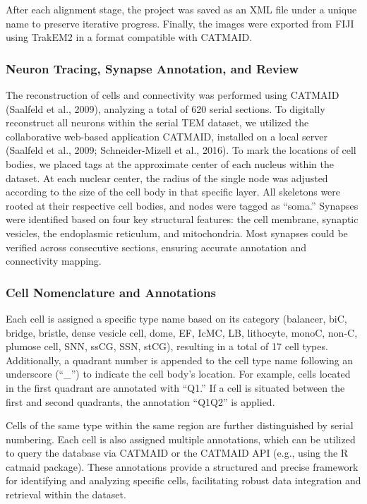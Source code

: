 \documentclass[
  11pt,
]{article}
\begin{document}
After each alignment stage, the project was saved as an XML file under a
unique name to preserve iterative progress. Finally, the images were
exported from FIJI using TrakEM2 in a format compatible with CATMAID.

\subsubsection{Neuron Tracing, Synapse Annotation, and
Review}\label{neuron-tracing-synapse-annotation-and-review}

The reconstruction of cells and connectivity was performed using CATMAID
(Saalfeld et al., 2009), analyzing a total of 620 serial sections. To
digitally reconstruct all neurons within the serial TEM dataset, we
utilized the collaborative web-based application CATMAID, installed on a
local server (Saalfeld et al., 2009; Schneider-Mizell et al., 2016). To
mark the locations of cell bodies, we placed tags at the approximate
center of each nucleus within the dataset. At each nuclear center, the
radius of the single node was adjusted according to the size of the cell
body in that specific layer. All skeletons were rooted at their
respective cell bodies, and nodes were tagged as ``soma.'' Synapses were
identified based on four key structural features: the cell membrane,
synaptic vesicles, the endoplasmic reticulum, and mitochondria. Most
synapses could be verified across consecutive sections, ensuring
accurate annotation and connectivity mapping.

\subsubsection{Cell Nomenclature and
Annotations}\label{cell-nomenclature-and-annotations}

Each cell is assigned a specific type name based on its category
(balancer, biC, bridge, bristle, dense vesicle cell, dome, EF, IcMC, LB,
lithocyte, monoC, non-C, plumose cell, SNN, ssCG, SSN, stCG), resulting
in a total of 17 cell types. Additionally, a quadrant number is appended
to the cell type name following an underscore (``\_'') to indicate the
cell body's location. For example, cells located in the first quadrant
are annotated with ``Q1.'' If a cell is situated between the first and
second quadrants, the annotation ``Q1Q2'' is applied.

Cells of the same type within the same region are further distinguished
by serial numbering. Each cell is also assigned multiple annotations,
which can be utilized to query the database via CATMAID or the CATMAID
API (e.g., using the R catmaid package). These annotations provide a
structured and precise framework for identifying and analyzing specific
cells, facilitating robust data integration and retrieval within the
dataset.
\end{document}
